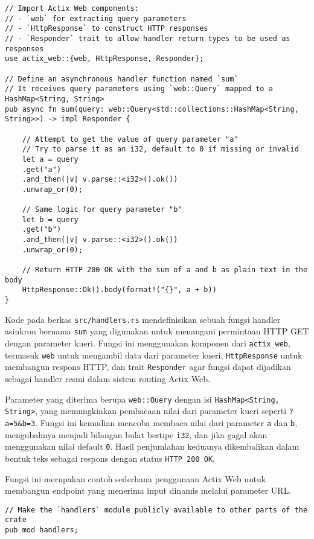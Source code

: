 \begin{lstlisting}[style=RustStyle, caption={src/handlers.rs}]
// Import Actix Web components:
// - `web` for extracting query parameters
// - `HttpResponse` to construct HTTP responses
// - `Responder` trait to allow handler return types to be used as responses
use actix_web::{web, HttpResponse, Responder};

// Define an asynchronous handler function named `sum`
// It receives query parameters using `web::Query` mapped to a HashMap<String, String>
pub async fn sum(query: web::Query<std::collections::HashMap<String, String>>) -> impl Responder {
	
	// Attempt to get the value of query parameter "a"
	// Try to parse it as an i32, default to 0 if missing or invalid
	let a = query
	.get("a")
	.and_then(|v| v.parse::<i32>().ok())
	.unwrap_or(0);
	
	// Same logic for query parameter "b"
	let b = query
	.get("b")
	.and_then(|v| v.parse::<i32>().ok())
	.unwrap_or(0);
	
	// Return HTTP 200 OK with the sum of a and b as plain text in the body
	HttpResponse::Ok().body(format!("{}", a + b))
}

\end{lstlisting}

Kode pada berkas \texttt{src/handlers.rs} mendefinisikan sebuah fungsi handler asinkron bernama \texttt{sum} yang digunakan untuk menangani permintaan HTTP GET dengan parameter kueri. Fungsi ini menggunakan komponen dari \texttt{actix\_web}, termasuk \texttt{web} untuk mengambil data dari parameter kueri, \texttt{HttpResponse} untuk membangun respons HTTP, dan trait \texttt{Responder} agar fungsi dapat dijadikan sebagai handler resmi dalam sistem routing Actix Web.

Parameter yang diterima berupa \texttt{web::Query} dengan isi \texttt{HashMap<String, String>}, yang memungkinkan pembacaan nilai dari parameter kueri seperti \texttt{?a=5\&b=3}. Fungsi ini kemudian mencoba membaca nilai dari parameter \texttt{a} dan \texttt{b}, mengubahnya menjadi bilangan bulat bertipe \texttt{i32}, dan jika gagal akan menggunakan nilai default \texttt{0}. Hasil penjumlahan keduanya dikembalikan dalam bentuk teks sebagai respons dengan status \texttt{HTTP 200 OK}.

Fungsi ini merupakan contoh sederhana penggunaan Actix Web untuk membangun endpoint yang menerima input dinamis melalui parameter URL.


\begin{lstlisting}[style=RustStyle, caption={src/lib.rs}]
// Make the `handlers` module publicly available to other parts of the crate
pub mod handlers;
\end{lstlisting}

